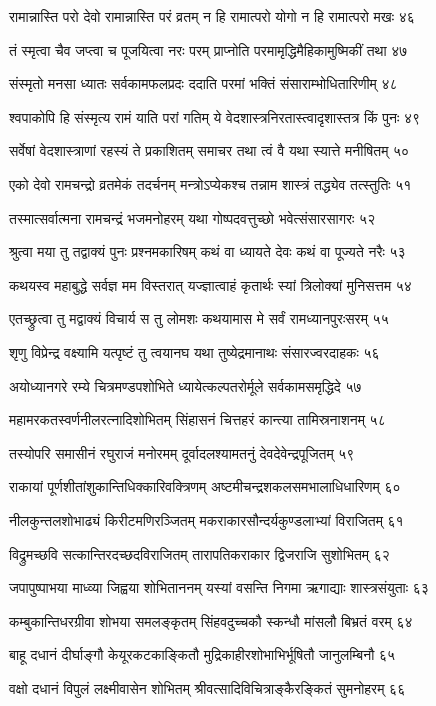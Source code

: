 रामान्नास्ति परो देवो रामान्नास्ति परं व्रतम्
न हि रामात्परो योगो न हि रामात्परो मखः ४६

तं स्मृत्वा चैव जप्त्वा च पूजयित्वा नरः परम्
प्राप्नोति परमामृद्धिमैहिकामुष्मिकीं तथा ४७

संस्मृतो मनसा ध्यातः सर्वकामफलप्रदः
ददाति परमां भक्तिं संसाराम्भोधितारिणीम् ४८

श्वपाकोपि हि संस्मृत्य रामं याति परां गतिम्
ये वेदशास्त्रनिरतास्त्वादृशास्तत्र किं पुनः ४९

सर्वेषां वेदशास्त्राणां रहस्यं ते प्रकाशितम्
समाचर तथा त्वं वै यथा स्यात्ते मनीषितम् ५०

एको देवो रामचन्द्रो व्रतमेकं तदर्चनम्
मन्त्रोऽप्येकश्च तन्नाम शास्त्रं तद्ध्येव तत्स्तुतिः ५१

तस्मात्सर्वात्मना रामचन्द्रं भजमनोहरम्
यथा गोष्पदवत्तुच्छो भवेत्संसारसागरः ५२

श्रुत्वा मया तु तद्वाक्यं पुनः प्रश्नमकारिषम्
कथं वा ध्यायते देवः कथं वा पूज्यते नरैः ५३

कथयस्व महाबुद्धे सर्वज्ञ मम विस्तरात्
यज्ज्ञात्वाहं कृतार्थः स्यां त्रिलोक्यां मुनिसत्तम ५४

एतच्छ्रुत्वा तु मद्वाक्यं विचार्य स तु लोमशः
कथयामास मे सर्वं रामध्यानपुरःसरम् ५५

शृणु विप्रेन्द्र वक्ष्यामि यत्पृष्टं तु त्वयानघ
यथा तुष्येद्रमानाथः संसारज्वरदाहकः ५६

अयोध्यानगरे रम्ये चित्रमण्डपशोभिते
ध्यायेत्कल्पतरोर्मूले सर्वकामसमृद्धिदे ५७

महामरकतस्वर्णनीलरत्नादिशोभितम्
सिंहासनं चित्तहरं कान्त्या तामिस्रनाशनम् ५८

तस्योपरि समासीनं रघुराजं मनोरमम्
दूर्वादलश्यामतनुं देवदेवेन्द्रपूजितम् ५९

राकायां पूर्णशीतांशुकान्तिधिक्कारिवक्त्रिणम्
अष्टमीचन्द्रशकलसमभालाधिधारिणम् ६०

नीलकुन्तलशोभाढ्यं किरीटमणिरञ्जितम्
मकराकारसौन्दर्यकुण्डलाभ्यां विराजितम् ६१

विद्रुमच्छवि सत्कान्तिरदच्छदविराजितम्
तारापतिकराकार द्विजराजि सुशोभितम् ६२

जपापुष्पाभया माध्व्या जिह्वया शोभिताननम्
यस्यां वसन्ति निगमा ऋगाद्याः शास्त्रसंयुताः ६३

कम्बुकान्तिधरग्रीवा शोभया समलङ्कृतम्
सिंहवदुच्चकौ स्कन्धौ मांसलौ बिभ्रतं वरम् ६४

बाहू दधानं दीर्घाङ्गौ केयूरकटकाङ्कितौ
मुद्रिकाहीरशोभाभिर्भूषितौ जानुलम्बिनौ ६५

वक्षो दधानं विपुलं लक्ष्मीवासेन शोभितम्
श्रीवत्सादिविचित्राङ्कैरङ्कितं सुमनोहरम् ६६

